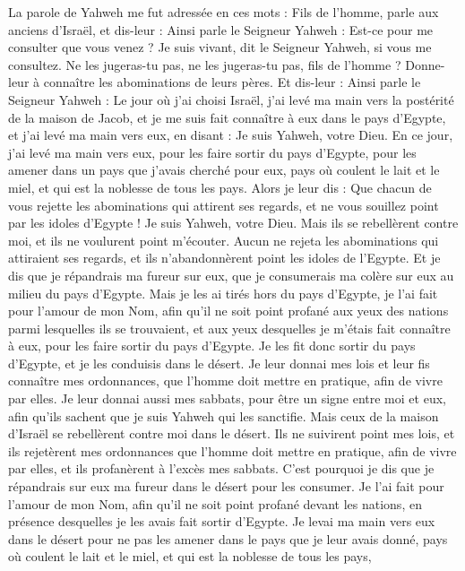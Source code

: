 \begin{multicols}{2}
La parole de Yahweh me fut adressée en ces mots :
Fils de l’homme, parle aux anciens d'Israël, et dis-leur : Ainsi parle le Seigneur Yahweh : Est-ce pour me consulter que vous venez ? Je suis vivant, dit le Seigneur Yahweh, si vous me consultez.
Ne les jugeras-tu pas, ne les jugeras-tu pas, fils de l’homme ? Donne-leur à connaître les abominations de leurs pères.
Et dis-leur : Ainsi parle le Seigneur Yahweh : Le jour où j’ai choisi Israël, j’ai levé ma main vers la postérité de la maison de Jacob, et je me suis fait connaître à eux dans le pays d'Egypte, et j’ai levé ma main vers eux, en disant : Je suis Yahweh, votre Dieu.
En ce jour, j’ai levé ma main vers eux, pour les faire sortir du pays d'Egypte, pour les amener dans un pays que j'avais cherché pour eux, pays où coulent le lait et le miel, et qui est la noblesse de tous les pays\FTNT{}.
Alors je leur dis : Que chacun de vous rejette les abominations qui attirent ses regards, et ne vous souillez point par les idoles d'Egypte ! Je suis Yahweh, votre Dieu\FTNT{}.
Mais ils se rebellèrent contre moi, et ils ne voulurent point m'écouter. Aucun ne rejeta les abominations qui attiraient ses regards,  et ils n’abandonnèrent point les idoles de l’Egypte. Et je dis que je répandrais ma fureur sur eux, que je consumerais ma colère sur eux au milieu du pays d'Egypte.
Mais je les ai tirés hors du pays d'Egypte, je l'ai fait pour l'amour de mon Nom, afin qu'il ne soit point profané aux yeux des nations parmi lesquelles ils se trouvaient, et aux yeux desquelles je m’étais fait connaître à eux, pour les faire sortir du pays d’Egypte.
Je les fit donc sortir du pays d'Egypte, et je les conduisis dans le désert.
Je leur donnai mes lois et leur fis connaître mes ordonnances, que l'homme doit mettre en pratique, afin de vivre par elles\FTNT{}.
Je leur donnai aussi mes sabbats, pour être un signe entre moi et eux, afin qu'ils sachent que je suis Yahweh qui les sanctifie\FTNT{}.
Mais ceux de la maison d'Israël se rebellèrent contre moi dans le désert. Ils ne suivirent point mes lois, et ils rejetèrent mes ordonnances que l'homme doit mettre en pratique, afin de vivre par elles, et ils profanèrent à l’excès mes sabbats. C’est pourquoi je dis que je répandrais sur eux ma fureur dans le désert pour les consumer\FTNT{}.
Je l'ai fait pour l'amour de mon Nom, afin qu'il ne soit point profané devant les nations, en présence desquelles je les avais fait sortir d'Egypte\FTNT{}.
Je levai ma main vers eux dans le désert pour ne pas les amener dans le pays que je leur avais donné, pays où coulent le lait et le miel, et qui est la noblesse de tous les pays,

\end{multicols}
